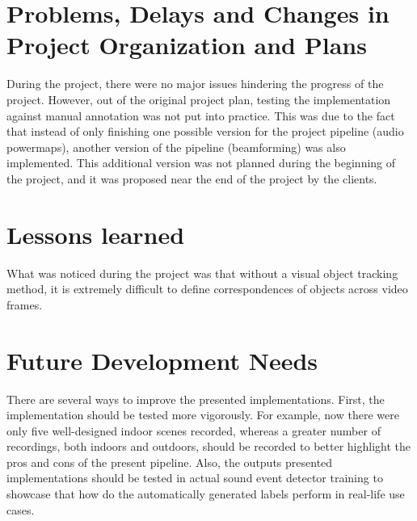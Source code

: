 \section{Problems, Delays and Changes in Project Organization and Plans}

During the project, there were no major issues hindering the progress of the project. However, out of the original project plan, testing the implementation against manual annotation was not put into practice. This was due to the fact that instead of only finishing one possible version for the project pipeline (audio powermaps), another version of the pipeline (beamforming) was also implemented. This additional version was not planned during the beginning of the project, and it was proposed near the end of the project by the clients.

\section{Lessons learned}

What was noticed during the project was that without a visual object tracking method, it is extremely difficult to define correspondences of objects across video frames.


\section{Future Development Needs}

There are several ways to improve the presented implementations. First, the implementation should be tested more vigorously. For example, now there were only five well-designed indoor scenes recorded, whereas a greater number of recordings, both indoors and outdoors, should be recorded to better highlight the pros and cons of the present pipeline. Also, the outputs presented implementations should be tested in actual sound event detector training to showcase that how do the automatically generated labels perform in real-life use cases.

